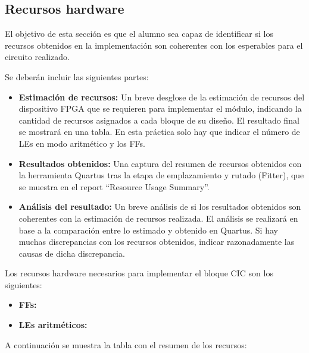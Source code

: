 \documentclass[parskip,a4paper,12pt]{article}
\begin{document}
\subsection{Recursos hardware}
\begin{enunciado}{}{}%
El objetivo de esta sección es que el alumno sea capaz de identificar si los recursos obtenidos en la implementación son coherentes con los esperables para el circuito realizado.

Se deberán incluir las siguientes partes: 
\begin{itemize}
\item \textbf{Estimación de recursos:} Un breve desglose de la estimación de recursos  del dispositivo FPGA que se requieren para implementar el módulo, indicando la cantidad de recursos asignados a cada bloque de su diseño. El resultado final se mostrará en una tabla. En esta práctica solo hay que indicar el número de LEs en modo aritmético y los FFs. 

\item \textbf{Resultados obtenidos:} Una captura del resumen de recursos obtenidos con la herramienta Quartus tras la etapa de emplazamiento y rutado (Fitter), que se muestra en el report ``Resource Usage Summary''.  

\item \textbf{Análisis del resultado:} Un breve análisis de si los resultados obtenidos son coherentes con la estimación de recursos realizada. El análisis se realizará en base a la comparación entre lo estimado y obtenido en Quartus. Si hay muchas discrepancias con los recursos obtenidos, indicar razonadamente las causas de dicha discrepancia.
\end{itemize}

\end{enunciado}
Los recursos hardware necesarios para implementar el bloque CIC son los siguientes:
\begin{itemize}
\item \textbf{FFs:} 


\item \textbf{LEs aritméticos:} 

\end{itemize}

A continuación se muestra la tabla con el resumen de los recursos: 


\def\colUNO{5.5 cm}
\def\colDOS{5 cm}
\def\colTRES{5 cm}
\end{document}
